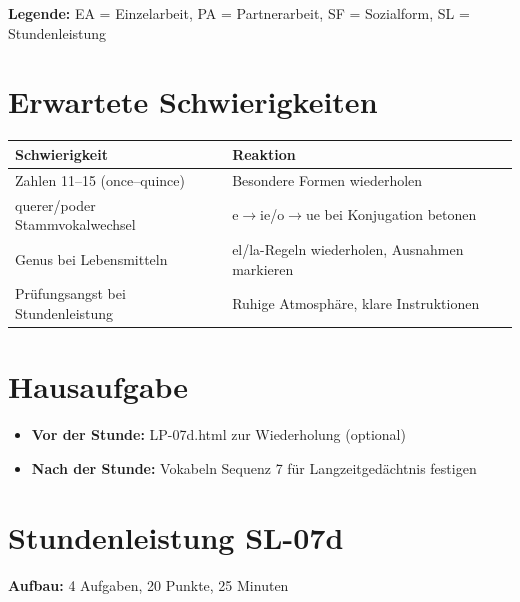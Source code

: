 \documentclass[11pt,a4paper]{article}
\begin{document}
\textbf{Legende:} EA = Einzelarbeit, PA = Partnerarbeit, SF = Sozialform, SL = Stundenleistung

\section{Erwartete Schwierigkeiten}

\begin{tabular}{|p{5cm}|p{8cm}|}
\hline
\textbf{Schwierigkeit} & \textbf{Reaktion} \\
\hline
Zahlen 11--15 (once--quince) & Besondere Formen wiederholen \\
\hline
querer/poder Stammvokalwechsel & e$\rightarrow$ie/o$\rightarrow$ue bei Konjugation betonen \\
\hline
Genus bei Lebensmitteln & el/la-Regeln wiederholen, Ausnahmen markieren \\
\hline
Prüfungsangst bei Stundenleistung & Ruhige Atmosphäre, klare Instruktionen \\
\hline
\end{tabular}

\section{Hausaufgabe}

\begin{itemize}
    \item \textbf{Vor der Stunde:} LP-07d.html zur Wiederholung (optional)
    \item \textbf{Nach der Stunde:} Vokabeln Sequenz 7 für Langzeitgedächtnis festigen
\end{itemize}

\section{Stundenleistung SL-07d}

\textbf{Aufbau:} 4 Aufgaben, 20 Punkte, 25 Minuten
\end{document}
